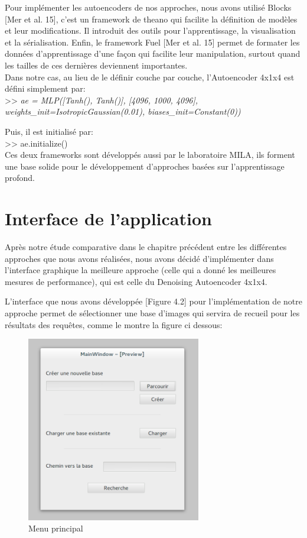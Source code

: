 	Pour implémenter les autoencoders de nos approches, nous avons utilisé Blocks [Mer et al. 15], c'est un framework de theano qui facilite la définition de modèles et leur modifications. Il introduit des outils pour l'apprentissage, la visualisation et la sérialisation. Enfin, le framework Fuel [Mer et al. 15] permet de formater les données d'apprentissage d'une façon qui facilite leur manipulation, surtout quand les tailles de ces dernières deviennent importantes.\\

	Dans notre cas, au lieu de le définir couche par couche, l'Autoencoder 4x1x4 est défini simplement par:\\

>> \textit{ae = MLP([Tanh(), Tanh()], [4096, 1000, 4096],
              weights\_init=IsotropicGaussian(0.01),
              biases\_init=Constant(0))\\
   }           

Puis, il est initialisé par:\\

>> ae.initialize()\\

	Ces deux frameworks sont développés aussi par le laboratoire MILA, ils forment une base solide pour le développement d’approches basées sur l'apprentissage profond.

\section{Interface de l'application}

	Après notre étude comparative dans le chapitre précédent entre les différentes approches que nous avons réalisées, nous avons décidé d'implémenter dans l'interface graphique la meilleure approche (celle qui a donné les meilleures mesures de performance), qui est celle du Denoising Autoencoder 4x1x4.

	L'interface que nous avons développée [Figure 4.2] pour l'implémentation de notre approche permet de sélectionner une base d'images qui servira de recueil pour les résultats des requêtes, comme le montre la figure ci dessous:


\begin{figure}[H]
	\centering
		\includegraphics[width=3in]{Figures/mainMenu.png}
	\caption[Menu principal]{Menu principal}
	\label{fig:Electron}
\end{figure}

